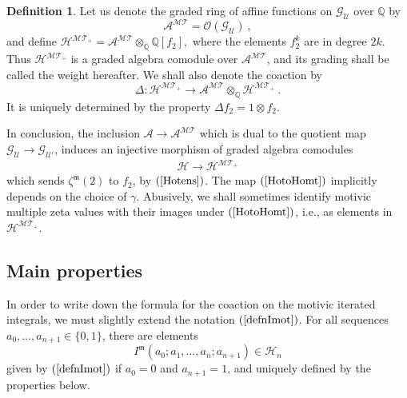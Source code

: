 \documentclass[10pt]{amsart}
\theoremstyle{definition}
\newtheorem{defn}[thm]{Definition}
\theoremstyle{remark}
\numberwithin{equation}{section}
\newcommand{\Ho}{\mathcal{H}}
\newcommand{\Homt}{\mathcal{H^{MT_+}}}
\newcommand{\MT}{\mathcal{MT}}
\newcommand{\GU}{\mathcal{G}_{\mathcal{U}}}
\newcommand{\GPU}{\mathcal{G_{\mathcal{U'}}}}
\newcommand{\Ao}{\mathcal{A}}
\newcommand{\zetam}{\zeta^{ \mathfrak{m}}}
\newcommand{\Imot}{I^{\mathfrak{m}}}
\newcommand{\Q}{\mathbb Q}
\newcommand{\To}{\longrightarrow}
\newcommand{\Amt}{\mathcal{A}^{\MT}}
\begin{document}
\begin{defn}Let us denote the graded ring of affine functions on $\GU$ over $\Q$ by
$$ \Amt = \mathcal{O}(\GU)\ , $$
and   define $\Homt=\Amt\otimes_{\Q}\Q[f_2],$
 where  the elements $f_2^k$  are in degree $2k$. Thus $\Homt$ is a graded algebra comodule over $\Amt$, and its  grading shall  be called
 the weight hereafter.  We shall also denote the coaction by 
 \begin{equation} \label{homtdelta}
 \Delta: \Homt \To \Amt \otimes_{\Q} \Homt\ .
 \end{equation} 
 It is uniquely determined by the property $\Delta f_2 = 1\otimes f_2$.
 \end{defn}
In conclusion,  the inclusion $\Ao\rightarrow \Amt$ which is dual to the quotient map $\GU \rightarrow \GPU$, induces 
an injective morphism of graded algebra comodules
\begin{eqnarray} \label{HotoHomt}
\Ho \To \Homt
\end{eqnarray}
which sends $\zetam(2)$ to $f_2$, by  $(\ref{Hotens})$. The map $(\ref{HotoHomt})$ implicitly depends on the choice of $\gamma$.
Abusively, we shall sometimes 
identify  motivic multiple zeta values with their images under $(\ref{HotoHomt})$, i.e., 
as elements in $\Homt$.  



\subsection{Main properties} In order to write down the formula for the coaction on the motivic iterated integrals, we must slightly extend the notation    $(\ref{defnImot})$. 
 For all sequences $a_0,\ldots, a_{n+1} \in \{0,1\}$,  there are   elements 
 \begin{equation} \label{Sec2Imotdef}
 \Imot(a_0;a_1,\ldots,a_n ;a_{n+1}) \in \Ho_n \end{equation} 
 given  by $(\ref{defnImot})$ if $a_0=0$ and $a_{n+1}=1$, and uniquely defined by the   properties below.
  
\end{document}

